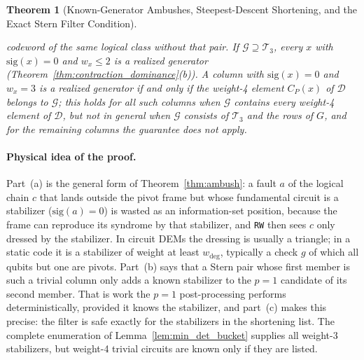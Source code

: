 \documentclass[12pt]{article}
\newtheorem{theorem}{Theorem}
\theoremstyle{definition}
\newcommand{\Dc}{\mathcal{D}}
\newcommand{\Tc}{\mathcal{T}_3}
\newcommand{\Gc}{\mathcal{G}}
\newcommand{\ttt}[1]{\texttt{#1}}
\begin{document}
\begin{theorem}[Known-Generator Ambushes, Steepest-Descent Shortening, and the Exact Stern Filter
  Condition]
\begin{enumerate}[label=(\alph*)]
    codeword of the same logical class without that pair. If $\Gc \supseteq \Tc$, every $x$ with $\mathrm{sig}(x) = 0$
    and $w_x \le 2$ is a realized generator (Theorem~\ref{thm:contraction_dominance}(b)). A column with
    $\mathrm{sig}(x) = 0$ and $w_x = 3$ is a realized generator if and only if the weight-4 element $C_P(x)$ of $\Dc$
    belongs to $\Gc$; this holds for all such columns when $\Gc$ contains every weight-4 element of $\Dc$, but not in
    general when $\Gc$ consists of $\Tc$ and the rows of $G$, and for the remaining columns the guarantee does not
    apply.
\end{enumerate}
\end{theorem}

\paragraph{Physical idea of the proof.}
Part~(a) is the general form of Theorem~\ref{thm:ambush}: a fault $a$ of the logical chain $c$ that lands outside the
pivot frame but whose fundamental circuit is a stabilizer ($\mathrm{sig}(a) = 0$) is wasted as an information-set
position, because the frame can reproduce its syndrome by that stabilizer, and \ttt{RW} then sees $c$ only dressed by
the stabilizer. In circuit DEMs the dressing is usually a triangle; in a static code it is a stabilizer of weight at
least $w_{\deg}$, typically a check $g$ of which all qubits but one are pivots. Part~(b) says that a Stern pair whose
first member is such a trivial column only adds a known stabilizer to the $p = 1$ candidate of its second member.
That is work the $p = 1$ post-processing performs deterministically, provided it knows the stabilizer, and
part~(c) makes this precise: the filter is safe exactly for the stabilizers in the shortening list. The complete
enumeration of Lemma~\ref{lem:min_det_bucket} supplies all weight-3 stabilizers, but weight-4 trivial circuits are
known only if they are listed.
\end{document}
